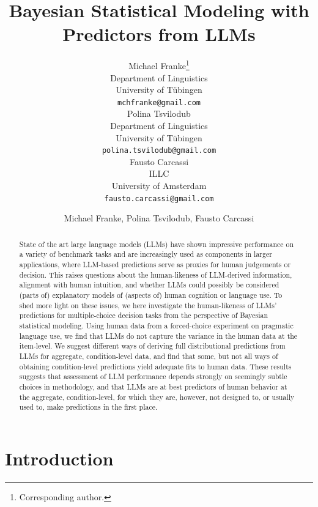 \documentclass[fleqn]{article}
\title{Bayesian Statistical Modeling with Predictors from LLMs}
\date{}
\author{ Michael Franke\thanks{Corresponding author.} \\
	Department of Linguistics\\
	University of Tübingen\\
	\texttt{mchfranke@gmail.com} \\
	\And
	Polina Tsvilodub \\
	Department of Linguistics\\
	University of Tübingen\\
	\texttt{polina.tsvilodub@gmail.com} \\
	\And
	Fausto Carcassi \\
	ILLC\\
	University of Amsterdam\\
	\texttt{fausto.carcassi@gmail.com} \\
}
\author{Michael Franke, Polina Tsvilodub, Fausto Carcassi}
\affil{Department of Linguistics\\University of Tübingen\\
\texttt{[michael.franke|polina.tsvilodub|fausto.carcassi]@uni-tuebingen.de}}
\begin{document}
\maketitle

\begin{abstract}
  State of the art large language models (LLMs) have shown impressive performance on a variety of benchmark tasks and are increasingly used as components in larger applications, where LLM-based predictions serve as proxies for human judgements or decision.
  This raises questions about the human-likeness of LLM-derived information, alignment with human intuition, and whether LLMs could possibly be considered (parts of) explanatory models of (aspects of) human cognition or language use.
  To shed more light on these issues, we here investigate the human-likeness of LLMs' predictions for multiple-choice decision tasks from the perspective of Bayesian statistical modeling.
  Using human data from a forced-choice experiment on pragmatic language use, we find that LLMs do not capture the variance in the human data at the item-level.
  We suggest different ways of deriving full distributional predictions from LLMs for aggregate, condition-level data, and find that some, but not all ways of obtaining condition-level predictions yield adequate fits to human data.
  These results suggests that assessment of LLM performance depends strongly on seemingly subtle choices in methodology, and that LLMs are at best predictors of human behavior at the aggregate, condition-level, for which they are, however, not designed to, or usually used to, make predictions in the first place.
\end{abstract}



\section{Introduction}
\label{sec:introduction}
\end{document}
